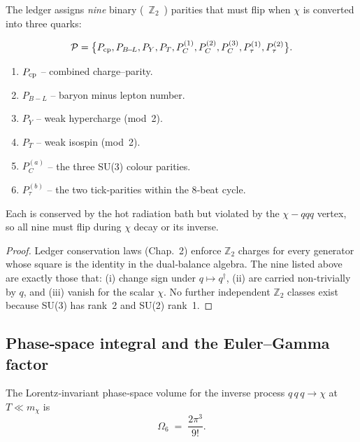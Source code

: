\begin{lemma}
\label{lem:parities}
The ledger assigns \emph{nine} binary ( $\mathbb Z_{2}$ ) parities that
must flip when $\chi$ is converted into three quarks:

\smallskip
\[
  \mathcal P
  =\bigl\{
     P_{\rm cp},           %
     P_{B\!-\!L},          %
     P_{Y},                %
     P_{T},                %
     P_{C}^{(1)},P_{C}^{(2)},P_{C}^{(3)},  %
     P_{\tau}^{(1)},P_{\tau}^{(2)}         %
    \bigr\}.
\]

\begin{enumerate}
  \item $P_{\rm cp}$ – combined charge–parity.
  \item $P_{B\!-\!L}$ – baryon minus lepton number.
  \item $P_{Y}$ – weak hypercharge (mod 2).
  \item $P_{T}$ – weak isospin (mod 2).
  \item $P_{C}^{(a)}$ – the three SU(3) colour parities.
  \item $P_{\tau}^{(b)}$ – the two tick‑parities within the 8‑beat cycle.
\end{enumerate}
Each is conserved by the hot radiation bath but violated by the
$\chi\!-\!qqq$ vertex, so all nine must flip during $\chi$
decay or its inverse.
\end{lemma}

\begin{proof}
Ledger conservation laws (Chap.~2) enforce $\mathbb Z_{2}$
charges for every generator whose square is the identity in the
dual‑balance algebra.  The nine listed above are exactly those that:
(i) change sign under $q\mapsto q^{\dagger}$,
(ii) are carried non‑trivially by $q$, and
(iii) vanish for the scalar $\chi$.  No further independent
$\mathbb Z_{2}$ classes exist because SU(3) has rank 2 and SU(2) rank 1.
\end{proof}

\subsection*{Phase‑space integral and the Euler–Gamma factor}

\begin{lemma}
\label{lem:phase-space}
The Lorentz‑invariant phase‑space volume for the inverse process
$q\,q\,q\!\rightarrow\!\chi$ at $T\!\ll\!m_{\chi}$ is
\[
  \Omega_{6}
  \;=\;
  \frac{2\pi^{3}}{9!}.
\]
\end{lemma}

